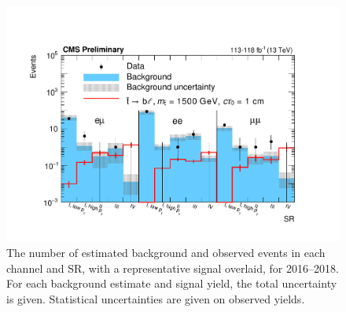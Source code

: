 \begin{figure}
\centering
\includegraphics[width=\textwidth]{figures/results/SRRun2yields_CMSPreliminary.pdf}
\caption{The number of estimated background and observed events in each channel and SR, with a representative signal overlaid, for 2016--2018. For each background estimate and signal yield, the total uncertainty is given. Statistical uncertainties are given on observed yields.}
\label{yields_combined}
\end{figure}